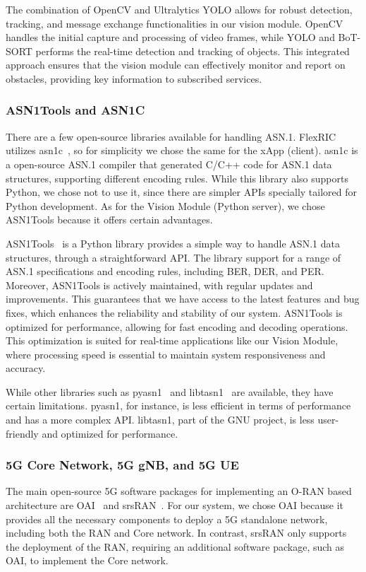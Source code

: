 The combination of OpenCV and Ultralytics YOLO allows for robust detection, tracking, and message exchange functionalities in our vision module.
OpenCV handles the initial capture and processing of video frames, while YOLO and BoT-SORT performs the real-time detection and tracking of objects.
This integrated approach ensures that the vision module can effectively monitor and report on obstacles, providing key information to subscribed services.

\subsubsection{ASN1Tools and ASN1C}
There are a few open-source libraries available for handling ASN.1.
FlexRIC utilizes asn1c~\cite{asn1c}, so for simplicity we chose the same for the xApp (client).
asn1c is a open-source ASN.1 compiler that generated C/C++ code for ASN.1 data structures, supporting different encoding rules.
While this library also supports Python, we chose not to use it, since there are simpler APIs specially tailored for Python development.
As for the Vision Module (Python server), we chose ASN1Tools because it offers certain advantages.

ASN1Tools~\cite{asn1tools} is a Python library provides a simple way to handle ASN.1 data structures, through a straightforward API\@.
The library support for a range of ASN.1 specifications and encoding rules, including BER, DER, and PER\@.
Moreover, ASN1Tools is actively maintained, with regular updates and improvements.
This guarantees that we have access to the latest features and bug fixes, which enhances the reliability and stability of our system.
ASN1Tools is optimized for performance, allowing for fast encoding and decoding operations.
This optimization is suited for real-time applications like our Vision Module, where processing speed is essential to maintain system responsiveness and accuracy.

While other libraries such as pyasn1~\cite{pyasn1} and libtasn1~\cite{libtasn1} are available, they have certain limitations.
pyasn1, for instance, is less efficient in terms of performance and has a more complex API\@.
libtasn1, part of the GNU project, is less user-friendly and optimized for performance.


\subsubsection{5G Core Network, 5G gNB, and 5G UE}
The main open-source 5G software packages for implementing an O-RAN based architecture are OAI~\cite{openairinterface} and srsRAN~\cite{srslte}.
For our system, we chose OAI because it provides all the necessary components to deploy a 5G standalone network, including both the RAN and Core network.
In contrast, srsRAN only supports the deployment of the RAN, requiring an additional software package, such as OAI, to implement the Core network.

